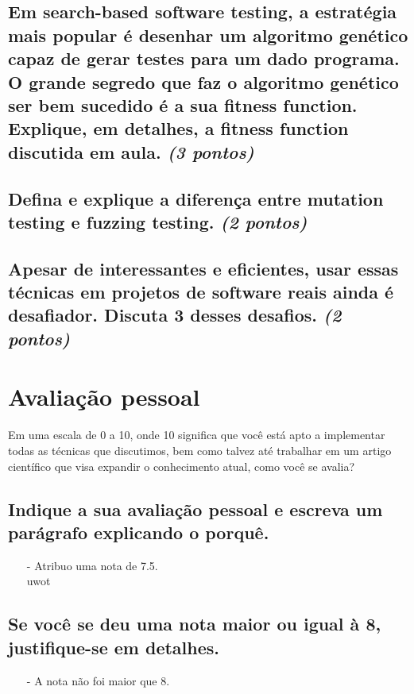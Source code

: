\documentclass[paper=a4, fontsize=11pt]{scrartcl} %
\numberwithin{equation}{section} %
\numberwithin{figure}{section} %
\numberwithin{table}{section} %
\begin{document}
\subsection{Em search-based software testing, a estratégia mais popular é desenhar um algoritmo genético capaz de gerar testes para um dado programa. O grande segredo que faz o algoritmo genético ser bem sucedido é a sua fitness function. Explique, em detalhes, a fitness function discutida em aula. \textit{(3 pontos)}}

\lipsum[3] %

\subsection{Defina e explique a diferença entre mutation testing e fuzzing testing. \textit{(2 pontos)}}

\lipsum[6] %

\subsection{Apesar de interessantes e eficientes, usar essas técnicas em projetos de software reais ainda é desafiador. Discuta 3 desses desafios. \textit{(2 pontos)}}

\section{Avaliação pessoal}

Em uma escala de 0 a 10, onde 10 significa que você está apto a implementar todas as técnicas que discutimos, bem como talvez até trabalhar em um artigo científico que visa expandir o conhecimento atual, como você se avalia?


\subsection{Indique a sua avaliação pessoal e escreva um parágrafo explicando o porquê.}

\begin{itemize}
    \item[-] Atribuo uma nota de 7.5.\\
    uwot
\end{itemize}

\subsection{Se você se deu uma nota maior ou igual à 8, justifique-se em detalhes.}

\begin{itemize}
    \item[-] A nota não foi maior que 8.
\end{itemize}
\end{document}
